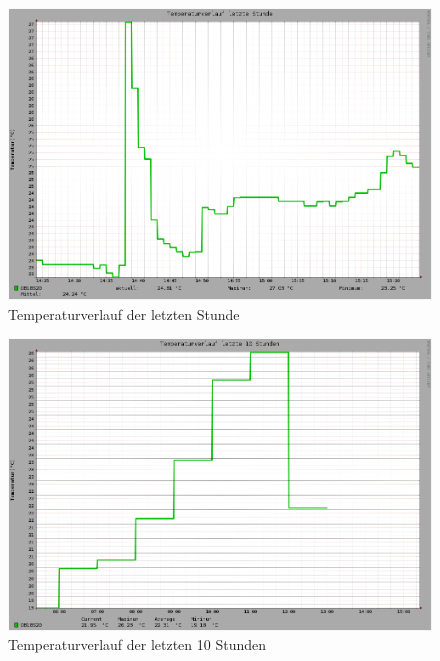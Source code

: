 \begin{figure}[!h] 
  \centering
     \includegraphics[scale=.28]{BilderAllgemein/TemperaturStunde.png}
  \caption{Temperaturverlauf der letzten Stunde}
  \label{Abb_Temperaturverlauf_Stunde_DS18S20}
\end{figure}

\begin{figure}[!h] 
  \centering
     \includegraphics[scale=.28]{BilderAllgemein/TemperaturTag.png}
  \caption{Temperaturverlauf der letzten 10 Stunden}
  \label{Abb_Temperaturverlauf_10Stunden_DS18S20}
\end{figure}

